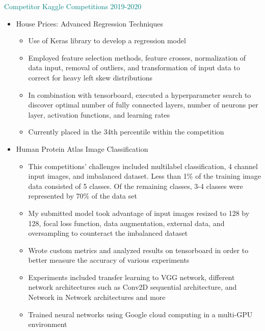 \documentclass[11pt]{ltxdoc}
\begin{document}
		{\textcolor{teal}{Competitor} \hfill \textcolor{teal}{Kaggle Competitions} \hfill \textcolor{teal}{2019-2020}}
		\begin{itemize}
        	  \item House Prices: Advanced Regression Techniques
        	    \begin{itemize}
        	      \item Use of Keras library to develop a regression model
        	      \item Employed feature selection methods, feature crosses, normalization of data input, removal of outliers, and transformation of input data to correct for heavy left skew distributions
        	      \item In combination with tensorboard, executed a hyperparameter search to discover optimal number of fully connected layers, number of neurons per layer, activation functions, and learning rates
        	      \item Currently placed in the 34th percentile within the competition
        	    \end{itemize}
        	  \item Human Protein Atlas Image Classification
        	    \begin{itemize}
        	      \item This competitions' challenges included multilabel classification, 4 channel input images, and imbalanced dataset. Less than 1\% of the training image data consisted of 5 classes. Of the remaining classes, 3-4 classes were represented by 70\% of the data set
        	      \item My submitted model took advantage of input images resized to 128 by 128, focal loss function, data augmentation, external data, and oversampling to counteract the imbalanced dataset
        	      \item Wrote custom metrics and analyzed results on tensorboard in order to better measure the accuracy of various experiments
        	      \item Experiments included transfer learning to VGG network, different network architectures such as Conv2D sequential architecture, and Network in Network architectures and more
        	      \item Trained neural networks using Google cloud computing in a multi-GPU environment
        	    \end{itemize}
        	\end{itemize}
		
\end{document}
